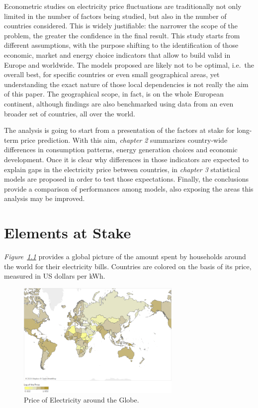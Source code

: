 \documentclass[a4paper,12pt]{book}
\begin{document}
Econometric studies on electricity price fluctuations are traditionally not only limited in the number of factors being studied, but also in the number of countries considered. This is widely justifiable: the narrower the scope of the problem, the greater the confidence in the final result. This study starts from different assumptions, with the purpose shifting to the identification of those economic, market and energy choice indicators that allow to build valid in Europe and worldwide. The models proposed are likely not to be optimal, i.e.\ the overall best, for specific countries or even small geographical areas, yet understanding the exact nature of those local dependencies is not really the aim of this paper. The geographical scope, in fact, is on the whole European continent, although findings are also benchmarked using data from an even broader set of countries, all over the world.

The analysis is going to start from a presentation of the factors at stake for long-term price prediction. With this aim, \textit{chapter 2} summarizes country-wide differences in consumption patterns, energy generation choices and economic development. Once it is clear why differences in those indicators are expected to explain gaps in the electricity price between countries, in \textit{chapter 3} statistical models are proposed in order to test those expectations. Finally, the conclusions provide a comparison of performances among models, also exposing the areas this analysis may be improved.
 
\chapter{Elements at Stake}

\textit{Figure~\ref{fig:world_cost}} provides a global picture of the amount spent by households around the world for their electricity bills. Countries are colored on the basis of its price, measured in US dollars per kWh.

\begin{figure}[tb]
\begin{center}
\includegraphics[width=0.7\textwidth]{Images/world2020.png}
\end{center}
\captionsetup{justification=centering}
\caption{Price of Electricity around the Globe.}
\label{fig:world_cost}
\end{figure}
\end{document}
